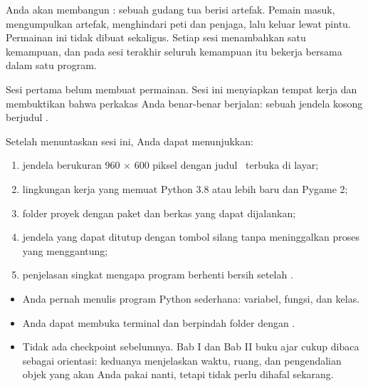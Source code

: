 

Anda akan membangun \NamaPermainan: sebuah gudang tua berisi artefak. Pemain
masuk, mengumpulkan artefak, menghindari peti dan penjaga, lalu keluar lewat
pintu. Permainan ini tidak dibuat sekaligus. Setiap sesi menambahkan satu
kemampuan, dan pada sesi terakhir seluruh kemampuan itu bekerja bersama
dalam satu program.

Sesi pertama belum membuat permainan. Sesi ini menyiapkan tempat kerja dan
membuktikan bahwa perkakas Anda benar-benar berjalan: sebuah jendela kosong
berjudul \NamaPermainan.


\begin{tujuanbox}
Setelah menuntaskan sesi ini, Anda dapat menunjukkan:
\begin{enumerate}[leftmargin=1.5em, itemsep=0.2em]
  \item jendela berukuran 960 $\times$ 600 piksel dengan judul
        \NamaPermainan\ terbuka di layar;
  \item lingkungan kerja yang memuat Python 3.8 atau lebih baru dan Pygame 2;
  \item folder proyek dengan paket  dan berkas
         yang dapat dijalankan;
  \item jendela yang dapat ditutup dengan tombol silang tanpa meninggalkan
        proses yang menggantung;
  \item penjelasan singkat mengapa program berhenti bersih setelah
        .
\end{enumerate}
\end{tujuanbox}


\begin{prasyaratbox}
\begin{itemize}[leftmargin=1.4em, itemsep=0.25em]
  \item Anda pernah menulis program Python sederhana: variabel, fungsi, dan
        kelas.
  \item Anda dapat membuka terminal dan berpindah folder dengan .
  \item Tidak ada checkpoint sebelumnya. Bab I dan Bab II buku ajar cukup
        dibaca sebagai orientasi: keduanya menjelaskan waktu, ruang, dan
        pengendalian objek yang akan Anda pakai nanti, tetapi tidak perlu
        dihafal sekarang.
\end{itemize}
\end{prasyaratbox}

